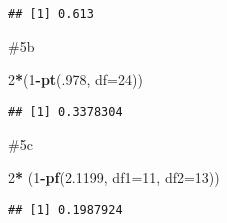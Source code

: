 \documentclass[
]{article}
\newenvironment{Shaded}{\begin{snugshade}}{\end{snugshade}}
\newcommand{\AttributeTok}[1]{\textcolor[rgb]{0.13,0.29,0.53}{#1}}
\newcommand{\DecValTok}[1]{\textcolor[rgb]{0.00,0.00,0.81}{#1}}
\newcommand{\FloatTok}[1]{\textcolor[rgb]{0.00,0.00,0.81}{#1}}
\newcommand{\FunctionTok}[1]{\textcolor[rgb]{0.13,0.29,0.53}{\textbf{#1}}}
\newcommand{\NormalTok}[1]{#1}
\newcommand{\SpecialCharTok}[1]{\textcolor[rgb]{0.81,0.36,0.00}{\textbf{#1}}}
\begin{document}
\begin{verbatim}
## [1] 0.613
\end{verbatim}

\#5b

\begin{Shaded}
\begin{Highlighting}[]
\DecValTok{2}\SpecialCharTok{*}\NormalTok{(}\DecValTok{1}\SpecialCharTok{{-}}\FunctionTok{pt}\NormalTok{(.}\DecValTok{978}\NormalTok{, }\AttributeTok{df=}\DecValTok{24}\NormalTok{))}
\end{Highlighting}
\end{Shaded}

\begin{verbatim}
## [1] 0.3378304
\end{verbatim}

\#5c

\begin{Shaded}
\begin{Highlighting}[]
\DecValTok{2}\SpecialCharTok{*}\NormalTok{ (}\DecValTok{1}\SpecialCharTok{{-}}\FunctionTok{pf}\NormalTok{(}\FloatTok{2.1199}\NormalTok{, }\AttributeTok{df1=}\DecValTok{11}\NormalTok{, }\AttributeTok{df2=}\DecValTok{13}\NormalTok{))}
\end{Highlighting}
\end{Shaded}

\begin{verbatim}
## [1] 0.1987924
\end{verbatim}
\end{document}
